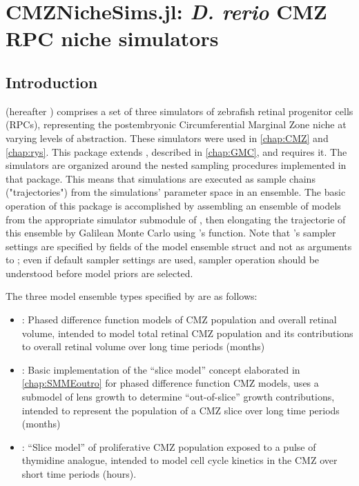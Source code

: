 \chapter{CMZNicheSims.jl: \textit{D. rerio} CMZ RPC niche simulators}
\label{chap:CNS}
\section{Introduction}
 (hereafter ) comprises a set of three simulators of zebrafish retinal progenitor cells (RPCs), representing the postembryonic Circumferential Marginal Zone niche at varying levels of abstraction. These simulators were used in \autoref{chap:CMZ} and \autoref{chap:rys}. This package extends , described in \autoref{chap:GMC}, and requires it. The simulators are organized around the nested sampling procedures implemented in that package. This means that simulations are executed as sample chains ("trajectories") from the simulations' parameter space in an ensemble. The basic operation of this package is accomplished by assembling an ensemble of models from the appropriate simulator submodule of , then elongating the trajectorie of this ensemble by Galilean Monte Carlo using 's  function. Note that 's sampler settings are specified by fields of the  model ensemble struct and not as arguments to ; even if default sampler settings are used, sampler operation should be understood before model priors are selected.

The three model ensemble types specified by  are as follows:

\begin{itemize}
    \item \protect{}: Phased difference function models of CMZ population and overall retinal volume, intended to model total retinal CMZ population and its contributions to overall retinal volume over long time periods (months)
    \item \protect{}: Basic implementation of the ``slice model'' concept elaborated in \autoref{chap:SMMEoutro} for phased difference function CMZ models, uses a submodel of lens growth to determine ``out-of-slice'' growth contributions, intended to represent the population of a CMZ slice over long time periods (months)
    \item \protect{}: ``Slice model'' of proliferative CMZ population exposed to a pulse of thymidine analogue, intended to model cell cycle kinetics in the CMZ over short time periods (hours). 
\end{itemize}

